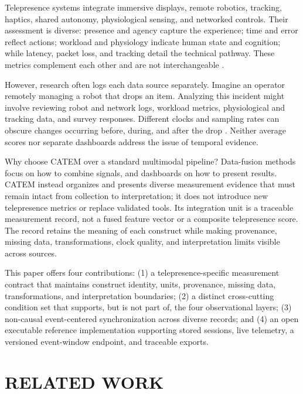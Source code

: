 \documentclass[letterpaper,10pt,conference]{ieeeconf}
\begin{document}
Telepresence systems integrate immersive displays, remote robotics, tracking, haptics, shared autonomy, physiological sensing, and networked controls. Their assessment is diverse: presence and agency capture the experience; time and error reflect actions; workload and physiology indicate human state and cognition; while latency, packet loss, and tracking detail the technical pathway. These metrics complement each other and are not interchangeable \cite{kilteni2012,hart1988,steinfeld2006}.

However, research often logs each data source separately. Imagine an operator remotely managing a robot that drops an item. Analyzing this incident might involve reviewing robot and network logs, workload metrics, physiological and tracking data, and survey responses. Different clocks and sampling rates can obscure changes occurring before, during, and after the drop \cite{falcone2024calibration}. Neither average scores nor separate dashboards address the issue of temporal evidence.

Why choose CATEM over a standard multimodal pipeline? Data-fusion methods focus on how to combine signals, and dashboards on how to present results. CATEM instead organizes and presents diverse measurement evidence that must remain intact from collection to interpretation; it does not introduce new telepresence metrics or replace validated tools. Its integration unit is a traceable measurement record, not a fused feature vector or a composite telepresence score. The record retains the meaning of each construct while making provenance, missing data, transformations, clock quality, and interpretation limits visible across sources.

This paper offers four contributions: (1) a telepresence-specific measurement contract that maintains construct identity, units, provenance, missing data, transformations, and interpretation boundaries; (2) a distinct cross-cutting condition set that supports, but is not part of, the four observational layers; (3) non-causal event-centered synchronization across diverse records; and (4) an open executable reference implementation supporting stored sessions, live telemetry, a versioned event-window endpoint, and traceable exports.

\section{RELATED WORK}
\end{document}
